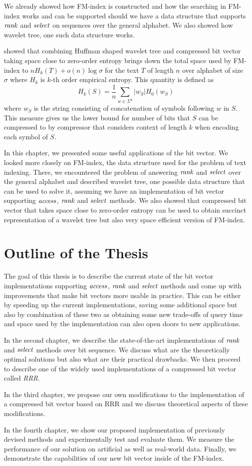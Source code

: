 We already showed how FM-index is constructed and how the searching in FM-index works and can be
supported should we have a data structure that supports $\mathit{rank}$ and $\mathit{select}$ on sequences over the general
alphabet. We also showed how wavelet tree, one such data structure works.

\cite{karkkainen2011fixed} showed that combining Huffman shaped wavelet tree and compressed bit vector taking
space close to zero-order entropy brings down the total space used by FM-index to $nH_k(T)+o(n)\log\sigma$ for
the text $T$ of length $n$ over alphabet of size $\sigma$ where $H_k$ is $k$-th order empirical entropy. This
quantity is defined as $$H_k(S) = \frac{1}{n} \sum_{w\in \Sigma^k} |w_S| H_0(w_S)$$ where $w_S$ is the string
consisting of concatenation of symbols following $w$ in $S$. This measure gives us the lower bound for number
of bits that $S$ can be compressed to by compressor that considers context of length $k$ when encoding each
symbol of $S$.

In this chapter, we presented some useful applications of the bit vector. We looked more closely on
FM-index, the data structure used for the problem of text indexing. There, we encountered the
problem of answering $\mathit{rank}$ and $\mathit{select}$ over the general alphabet and described wavelet tree,
one possible data structure that can be used to solve it, assuming we have an implementation of
bit vector supporting $\mathit{access}$, $\mathit{rank}$ and $\mathit{select}$ methods. We also showed that compressed bit
vector that takes space close to zero-order entropy can be used to obtain succinct representation of
a wavelet tree but also very space efficient version of FM-index.

\section{Outline of the Thesis}

The goal of this thesis is to describe the current state of the bit vector implementations
supporting $\mathit{access}$, $\mathit{rank}$ and $\mathit{select}$ methods and come up with improvements that
make bit vectors more usable in practice. This can be either by speeding up the current
implementations, saving some additional space but also by combination of these two as
obtaining some new trade-offs of query time and space used by the implementation can
also open doors to new applications.

In the second chapter, we describe the state-of-the-art implementations of $\mathit{rank}$ and
$\mathit{select}$ methods over bit sequence. We discuss what are the theoretically optimal
solutions but also what are their practical drawbacks. We then proceed to describe one
of the widely used implementations of a compressed bit vector called \textit{RRR}.

In the third chapter, we propose our own modifications to the implementation of
a compressed bit vector based on RRR and we discuss theoretical aspects of these
modifications.

In the fourth chapter, we show our proposed implementation of previously devised
methods and experimentally test and evaluate them. We measure the performance
of our solution on artificial as well as real-world data. Finally, we demonstrate
the capabilities of our new bit vector inside of the FM-index.